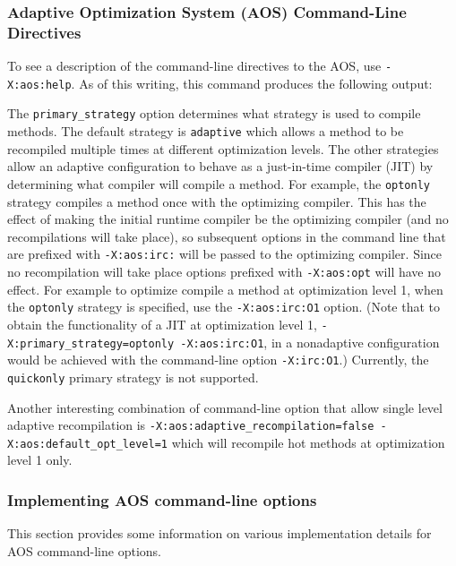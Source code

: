 \subsubsection{Adaptive Optimization System (AOS) Command-Line Directives}

To see a description of the command-line directives to the
AOS, use {\tt -X:aos:help}.
As of this writing, this command produces the following output:



The {\tt primary\_strategy} option determines what strategy is used to compile
methods.
The default strategy is {\tt adaptive} which allows a method to be
recompiled multiple times at different optimization levels.
The other strategies allow an adaptive configuration to behave as a
just-in-time compiler (JIT) by determining what compiler will compile a method.
For example, the {\tt optonly} strategy compiles a method once with the 
optimizing compiler. This has the effect of making the initial runtime compiler
be the optimizing compiler (and no recompilations will take place), so 
subsequent options in the command line that are prefixed with {\tt -X:aos:irc:}
will be passed to the optimizing compiler. Since no recompilation will take
place options prefixed with {\tt -X:aos:opt} will have no effect.
For example to optimize compile a method at optimization level 1,
when the {\tt optonly} strategy is specified, use the {\tt -X:aos:irc:O1} option.
(Note that to obtain the functionality of a JIT at optimization level 1, 
{\tt -X:primary\_strategy=optonly -X:aos:irc:O1}, in a nonadaptive configuration
would be achieved with the command-line option {\tt -X:irc:O1}.)
Currently, the {\tt quickonly} primary strategy is not supported.


Another interesting combination of command-line option that allow single level
adaptive recompilation is 
{\tt -X:aos:adaptive\_recompilation=false -X:aos:default\_opt\_level=1} 
which will recompile hot methods at optimization level 1 only.

\subsubsection{Implementing AOS command-line options}

This section provides some information on various
implementation details for AOS command-line options.

